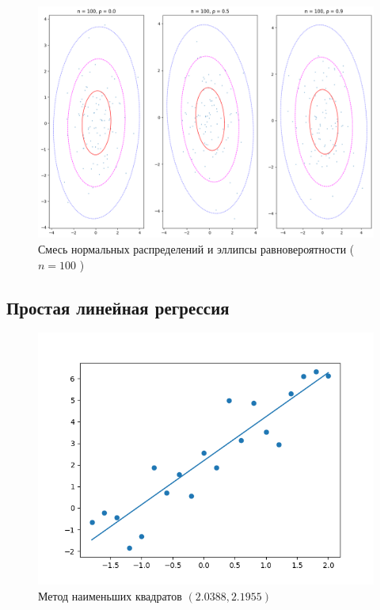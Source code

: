 \documentclass[12pt,a4paper]{article}
\begin{document}
	\begin{figure}[htbp!]
		\begin{center}
			\includegraphics[width = 0.8\linewidth]{graphics/lab5_ellips_100}
			\caption{Смесь нормальных распределений и эллипсы равновероятности
			( \( n = 100 \) )}
		\end{center}
	\end{figure}

	\clearpage

	\subsection{Простая линейная регрессия}

	\begin{figure}[htbp!]
		\begin{center}
			\includegraphics[width = 1\linewidth]{graphics/lab6_ls}
			\caption{Метод наименьших квадратов \( ( 2.0388, 2.1955) \)}
		\end{center}
	\end{figure}
\end{document}

